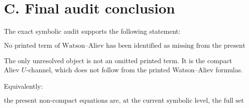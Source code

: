 \documentclass[11pt]{article}
\begin{document}
\section*{C. Final audit conclusion}

The exact symbolic audit supports the following statement:

\[
\boxed{
\text{No printed term of Watson--Aliev has been identified as missing from the present non-compact equations.}
}
\]

The only unresolved object is not an omitted printed term. It is the compact Aliev \(U\)-channel, which does not follow from the printed Watson--Aliev formulas.

Equivalently:

\[
\boxed{
\text{the present non-compact equations are, at the current symbolic level, the full set of terms derivable from the printed form of Watson--Aliev.}
}
\]
\end{document}
